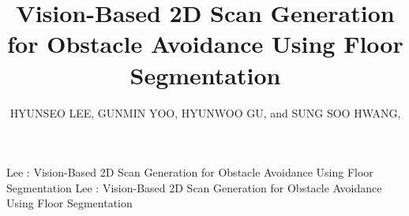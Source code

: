\documentclass{ieeeaccess}
\begin{document}
\doi{}

\title{Vision-Based 2D Scan Generation for Obstacle Avoidance Using Floor Segmentation}

\author{\uppercase{Hyunseo Lee},
\uppercase{Gunmin Yoo},
\uppercase{Hyunwoo Gu},
and \uppercase{Sung Soo Hwang}, }

\address[1]{School of Artificial Intelligence, Computer and Electrical Engineering, Handong Global University, Pohang 37554, Republic of Korea (e-mail: hslee@handong.ac.kr; gunminy@handong.ac.kr; 21800030@handong.ac.kr; sshwang@handong.edu)}


\markboth
{Lee \headeretal: Vision-Based 2D Scan Generation for Obstacle Avoidance Using Floor Segmentation}
{Lee \headeretal: Vision-Based 2D Scan Generation for Obstacle Avoidance Using Floor Segmentation}

\end{document}
